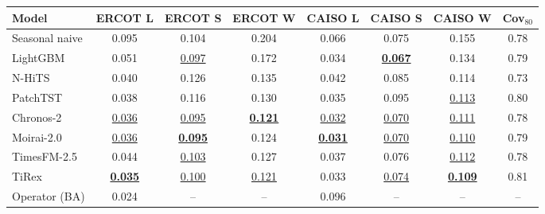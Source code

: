 \begin{tabular}{lccccccc}
\toprule
Model & ERCOT L & ERCOT S & ERCOT W & CAISO L & CAISO S & CAISO W & Cov$_{80}$ \\
\midrule
Seasonal naive & 0.095 & 0.104 & 0.204 & 0.066 & 0.075 & 0.155 & 0.78 \\
LightGBM & 0.051 & \underline{0.097} & 0.172 & 0.034 & \underline{\textbf{0.067}} & 0.134 & 0.79 \\
N-HiTS & 0.040 & 0.126 & 0.135 & 0.042 & 0.085 & 0.114 & 0.73 \\
PatchTST & 0.038 & 0.116 & 0.130 & 0.035 & 0.095 & \underline{0.113} & 0.80 \\
Chronos-2 & \underline{0.036} & \underline{0.095} & \underline{\textbf{0.121}} & \underline{0.032} & \underline{0.070} & \underline{0.111} & 0.78 \\
Moirai-2.0 & \underline{0.036} & \underline{\textbf{0.095}} & 0.124 & \underline{\textbf{0.031}} & \underline{0.070} & \underline{0.110} & 0.79 \\
TimesFM-2.5 & 0.044 & \underline{0.103} & 0.127 & 0.037 & 0.076 & \underline{0.112} & 0.78 \\
TiRex & \underline{\textbf{0.035}} & \underline{0.100} & \underline{0.121} & 0.033 & \underline{0.074} & \underline{\textbf{0.109}} & 0.81 \\
\midrule
Operator (BA) & 0.024 & -- & -- & 0.096 & -- & -- & -- \\
\bottomrule
\end{tabular}

